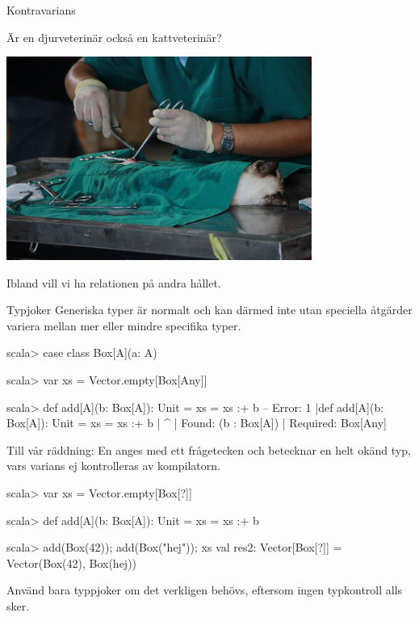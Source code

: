 \begin{Slide}{Kontravarians}
\begin{center}
Är en djurveterinär också en kattveterinär?

\includegraphics[width=0.75\textwidth]{../img/cat-vet.jpg}  

Ibland vill vi ha relationen på andra hållet.
\end{center}
\end{Slide}




\begin{Slide}{Typjoker }\SlideFontSmall
Generiska typer är normalt  och kan därmed inte utan speciella åtgärder variera mellan mer eller mindre specifika typer. %
\begin{REPLsmall}
scala> case class Box[A](a: A)

scala> var xs = Vector.empty[Box[Any]]

scala> def add[A](b: Box[A]): Unit = xs = xs :+ b
-- Error:
1 |def add[A](b: Box[A]): Unit = xs = xs :+ b
  |                                         ^
  |                                         Found:    (b : Box[A])
  |                                         Required: Box[Any]
\end{REPLsmall}  
Till vår räddning: En   anges med ett frågetecken och betecknar en helt okänd typ, vars varians ej kontrolleras av kompilatorn.
\begin{REPLsmall}
scala> var xs = Vector.empty[Box[?]]

scala> def add[A](b: Box[A]): Unit = xs = xs :+ b

scala> add(Box(42)); add(Box("hej")); xs
val res2: Vector[Box[?]] = Vector(Box(42), Box(hej))
\end{REPLsmall}
Använd bara typpjoker om det verkligen behövs, eftersom ingen typkontroll alls sker.
\end{Slide}


